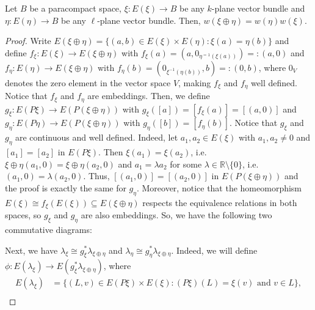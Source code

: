 \begin{proposition} Let $B$ be a paracompact space, $\xi:E(\xi)\to B$ be any $k$-plane vector bundle and $\eta:E(\eta)\to B$ be any $\ell$-plane vector bundle. Then, $w(\xi\oplus\eta)=w(\eta)w(\xi)$.
\end{proposition}
\begin{proof} Write $E(\xi\oplus\eta)=\big\{(a,b)\in E(\xi)\times E(\eta):\xi(a)=\eta(b)\big\}$ and define $f_{\xi}:E(\xi)\to E(\xi\oplus\eta)$ with $f_{\xi}(a)=(a,0_{\eta^{=1}(\xi(a))})=:(a,0)$ and $f_{\eta}:E(\eta)\to E(\xi\oplus\eta)$ with $f_{\eta}(b)=(0_{\xi^{-1}(\eta(b))},b)=:(0,b)$, where $0_V$ denotes the zero element in the vector space $V$, making $f_{\xi}$ and $f_{\eta}$ well defined. Notice that $f_{\xi}$ and $f_{\eta}$ are embeddings. Then, we define $g_{\xi}:E(P\xi)\to E(P(\xi\oplus\eta))$ with $g_{\xi}([a])=[f_{\xi}(a)]=[(a,0)]$ and $g_{\eta}:E(P\eta)\to E(P(\xi\oplus\eta))$ with $g_{\eta}([b])=[f_{\eta}(b)]$. Notice that $g_{\xi}$ and $g_{\eta}$ are continuous and well defined. Indeed, let $a_1,a_2\in E(\xi)$ with $a_1,a_2\neq0$ and $[a_1]=[a_2]$ in $E(P\xi)$. Then $\xi(a_1)=\xi(a_2)$, i.e. $\xi\oplus\eta(a_1,0)=\xi\oplus\eta(a_2,0)$ and $a_1=\lambda a_2$ for some $\lambda\in\mathbb{R}\setminus\{0\}$, i.e. $(a_1,0)=\lambda(a_2,0)$. Thus, $[(a_1,0)]=[(a_2,0)]$ in $E(P(\xi\oplus\eta))$ and the proof is exactly the same for $g_{\eta}$. Moreover, notice that the homeomorphism $E(\xi)\cong f_{\xi}(E(\xi))\subseteq E(\xi\oplus\eta)$ respects the equivalence relations in both spaces, so $g_{\xi}$ and $g_{\eta}$ are also embeddings. So, we have the following two commutative diagrams:
\begin{center}
\end{center}
Next, we have $\lambda_{\xi}\cong g_{\xi}^*\lambda_{\xi\oplus\eta}$ and $\lambda_{\eta}\cong g_{\eta}^*\lambda_{\xi\oplus\eta}$. Indeed, we will define $\phi:E(\lambda_{\xi})\to E(g_{\xi}^*\lambda_{\xi\oplus\eta})$, where
\begin{align*}
E(\lambda_{\xi})&=\big\{(L,v)\in E(P\xi)\times E(\xi):(P\xi)(L)=\xi(v)\text{ and }v\in L\big\},\\[0.5em]

\end{align*}
\end{proof}
